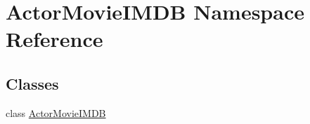 \hypertarget{namespace_actor_movie_i_m_d_b}{}\section{Actor\+Movie\+I\+M\+D\+B Namespace Reference}
\label{namespace_actor_movie_i_m_d_b}
\subsection*{Classes}
\begin{DoxyCompactItemize}
\item 
class \hyperlink{class_actor_movie_i_m_d_b_1_1_actor_movie_i_m_d_b}{Actor\+Movie\+I\+M\+D\+B}
\end{DoxyCompactItemize}
